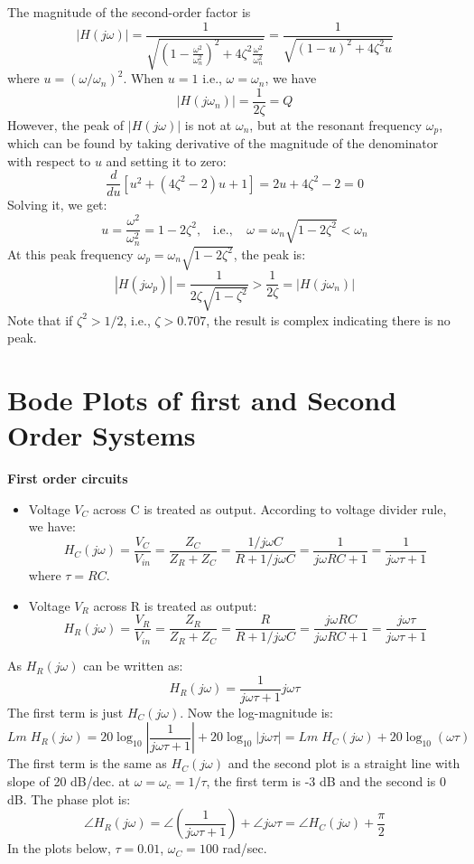 
  The magnitude of the second-order factor is
  \[ |H(j\omega)|
  =\frac{1}{\sqrt{(1-\frac{\omega^2}{\omega_n^2})^2+4\zeta^2 \frac{\omega^2}{\omega_n^2}}}
  =\frac{1}{\sqrt{(1-u)^2+4\zeta^2 u}} \]
  where $u=(\omega/\omega_n)^2$. When $u=1$ i.e., $\omega=\omega_n$, we have
  \[ | H(j\omega_n) |=\frac{1}{2\zeta}=Q \]
  However, the peak of $|H(j\omega)|$ is not at $\omega_n$, but at the resonant frequency 
  $\omega_p$, which can be found by taking derivative of the magnitude of the denominator 
  with respect to $u$ and setting it to zero:
  \[ \frac{d}{du}[u^2+(4\zeta^2-2)u+1]=2u+4\zeta^2-2=0 \]
  Solving it, we get:
  \[ u=\frac{\omega^2}{\omega_n^2}=1-2\zeta^2,\;\;\;\mbox{i.e.,}
  \;\;\;\;\omega=\omega_n\sqrt{1-2\zeta^2} < \omega_n \]
  At this peak frequency $\omega_p=\omega_n\sqrt{1-2\zeta^2}$, the peak is:
  \[ | H(j\omega_p) |=\frac{1}{2\zeta\sqrt{1-\zeta^2}} > \frac{1}{2\zeta}=| H(j\omega_n) | \]
  Note that if $\zeta^2>1/2$, i.e., $\zeta>0.707$, the result is complex indicating there 
  is no peak.


\section*{Bode Plots of first and Second Order Systems}
{\bf First order circuits}


\begin{itemize}
\item Voltage $V_C$ across C is treated as output. According to voltage
  divider rule, we have:
\[  H_C(j\omega)=\frac{V_C}{V_{in}}=\frac{Z_C}{Z_R+Z_C}
    =\frac{1/j\omega C}{R+1/j\omega C} 
    =\frac{1}{j\omega RC+1}=\frac{1}{j\omega \tau+1} \]
    where $\tau=RC$.
\item Voltage $V_R$ across R is treated as output:
  \[ H_R(j\omega)=\frac{V_R}{V_{in}}=\frac{Z_R}{Z_R+Z_C}
    =\frac{R}{R+1/j\omega C}=\frac{j\omega RC}{j\omega RC+1} 
    =\frac{j\omega \tau}{j\omega \tau+1} \]
\end{itemize}
As $H_R(j\omega)$ can be written as:
\[ H_R(j\omega)= \frac{1}{j\omega \tau+1} j\omega \tau  \]
The first term is just $H_C(j\omega)$. Now the log-magnitude is:
\[ Lm\;H_R(j\omega)
=20\log_{10} \left| \frac{1}{j\omega \tau+1}\right|+20\log_{10} \left| j\omega \tau \right| 
=Lm\; H_C(j\omega) +20\log_{10} (\omega\tau) \]
The first term is the same as $H_C(j\omega)$ and the second plot is a straight line
with slope of 20 dB/dec. at $\omega=\omega_c=1/\tau$, the first term is -3 dB and the  
second is 0 dB.  The phase plot is:
\[ \angle H_R(j\omega)=\angle \left(\frac{1}{j\omega \tau+1}\right)+\angle j\omega \tau  
=\angle H_C(j\omega)+\frac{\pi}{2} \]
In the plots below, $\tau=0.01$, $\omega_C=100$ rad/sec.

